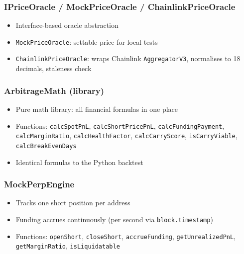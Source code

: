 \documentclass[11pt,a4paper]{article}
\begin{document}
\subsubsection{IPriceOracle / MockPriceOracle / ChainlinkPriceOracle}
\begin{itemize}
    \item Interface-based oracle abstraction
    \item \texttt{MockPriceOracle}: settable price for local tests
    \item \texttt{ChainlinkPriceOracle}: wraps Chainlink \texttt{AggregatorV3}, normalises to 18 decimals, staleness check
\end{itemize}

\subsubsection{ArbitrageMath (library)}
\begin{itemize}
    \item Pure math library: all financial formulas in one place
    \item Functions: \texttt{calcSpotPnL}, \texttt{calcShortPricePnL}, \texttt{calcFundingPayment}, \texttt{calcMarginRatio}, \texttt{calcHealthFactor}, \texttt{calcCarryScore}, \texttt{isCarryViable}, \texttt{calcBreakEvenDays}
    \item Identical formulas to the Python backtest
\end{itemize}

\subsubsection{MockPerpEngine}
\begin{itemize}
    \item Tracks one short position per address
    \item Funding accrues continuously (per second via \texttt{block.timestamp})
    \item Functions: \texttt{openShort}, \texttt{closeShort}, \texttt{accrueFunding}, \texttt{getUnrealizedPnL}, \texttt{getMarginRatio}, \texttt{isLiquidatable}
\end{itemize}
\end{document}
